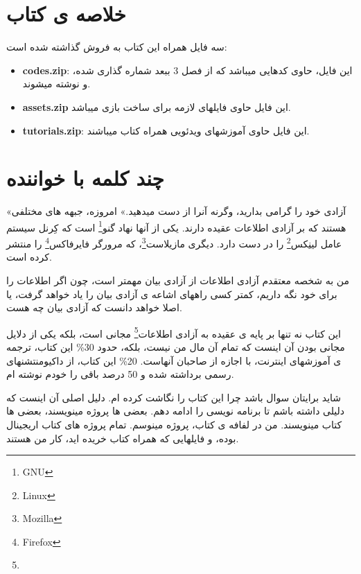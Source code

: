 \documentclass[14pt,a4paper]{memoir}
\begin{document}
	 
	 
	 \chapter*{خلاصه ی کتاب}
	 
	 
	 \begin{files}
	 	سه فایل همراه این کتاب به فروش گذاشته شده است:
	 	\begin{itemize}
	 		\item \textbf{codes.zip}: این فایل، حاوی کدهایی میباشد که از فصل 3 ببعد شماره گذاری شده، و نوشته میشوند.
	 		\item \textbf{assets.zip} این فایل حاوی فایلهای لازمه برای ساخت بازی میباشد.
	 		\item  \textbf{tutorials.zip}: این فایل حاوی آموزشهای ویدئویی همراه کتاب میباشند.
	 	\end{itemize}
	 \end{files}
	 
	 
	 \newpage
	 \tableofcontents
	 \mainmatter
	 
	 \chapter{چند کلمه با خواننده} \label{foreword}

	«آزادی خود را گرامی بدارید، وگرنه آنرا از دست میدهید.»
	امروزه، جبهه های مختلفی هستند که بر آزادی اطلاعات عقیده دارند. یکی از آنها نهاد گنو\footnote{GNU} است که کِرنل سیستم عامل لینِکس\footnote{Linux} را در دست دارد. دیگری مازیلاست\footnote{Mozilla}، که مرورگر فایرفاکس\footnote{Firefox} را منتشر کرده است. 
	
	من به شخصه معتقدم آزادی اطلاعات از آزادی بیان مهمتر است، چون اگر اطلاعات را برای خود نگه داریم، کمتر کسی راههای اشاعه ی آزادی بیان را یاد خواهد گرفت، یا اصلا خواهد دانست که آزادی بیان چه هست. 
	
	این کتاب نه تنها بر پایه ی عقیده به آزادی اطلاعات\footnote{} مجانی است، بلکه یکی از دلایل مجانی بودن آن اینست که تمام آن مال من نیست، بلکه، حدود 30\% این کتاب، ترجمه ی آموزشهای اینترنت، با اجازه از صاحبان آنهاست. 20\% این کتاب، از داکیومنتشنهای رسمی برداشته شده  و 50 درصد باقی را خودم نوشته ام.
	
	شاید برایتان سوال باشد چرا این کتاب را نگاشت کرده ام. دلیل اصلی آن اینست که دلیلی داشته باشم تا برنامه نویسی را ادامه دهم. بعضی ها پروژه مینویسند، بعضی ها کتاب مینویسند. من در لفافه ی کتاب، پروژه مینوسم. تمام پروژه های کتاب اریجینال بوده، و فایلهایی که همراه کتاب خریده اید، کار من هستند.
	
\end{document}
